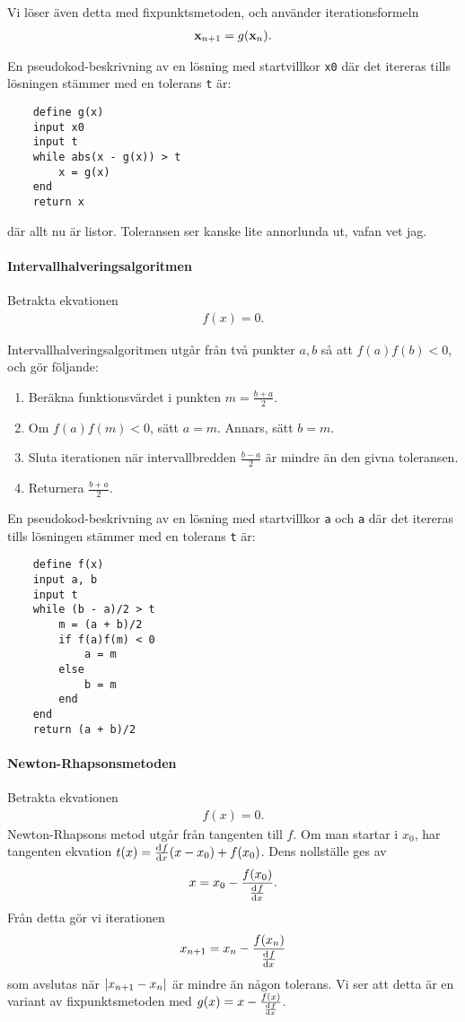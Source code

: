 Vi löser även detta med fixpunktsmetoden, och använder iterationsformeln
\begin{align*}
	\vb{x}_{n + 1} = g(\vb{x}_{n}).
\end{align*}

En pseudokod-beskrivning av en lösning med startvillkor \verb|x0| där det itereras tills lösningen stämmer med en tolerans \verb|t| är:
\begin{lstlisting}
	define g(x)
	input x0
	input t
	while abs(x - g(x)) > t
		x = g(x)
	end
	return x
\end{lstlisting}
där allt nu är listor. Toleransen ser kanske lite annorlunda ut, vafan vet jag.

\paragraph{Intervallhalveringsalgoritmen}
Betrakta ekvationen
\begin{align*}
	f(x) = 0.
\end{align*}

Intervallhalveringsalgoritmen utgår från två punkter $a, b$ så att $f(a)f(b) < 0$, och gör följande:
\begin{enumerate}
	\item Beräkna funktionsvärdet i punkten $m = \frac{b + a}{2}$.
	\item Om $f(a)f(m) < 0$, sätt $a = m$. Annars, sätt $b = m$.
	\item Sluta iterationen när intervallbredden $\frac{b - a}{2}$ är mindre än den givna toleransen.
	\item Returnera $\frac{b + a}{2}$.
\end{enumerate}

En pseudokod-beskrivning av en lösning med startvillkor \verb|a| och \verb|a| där det itereras tills lösningen stämmer med en tolerans \verb|t| är:
\begin{lstlisting}
	define f(x)
	input a, b
	input t
	while (b - a)/2 > t
		m = (a + b)/2
		if f(a)f(m) < 0
			a = m
		else
			b = m
		end
	end
	return (a + b)/2
\end{lstlisting}

\paragraph{Newton-Rhapsonsmetoden}
Betrakta ekvationen
\begin{align*}
	f(x) = 0.
\end{align*}
Newton-Rhapsons metod utgår från tangenten till $f$. Om man startar i $x_{0}$, har tangenten ekvation $t(x) = \dv[]{f}{x} (x_{0})(x - x_{0}) + f(x_{0})$. Dens nollställe ges av
\begin{align*}
	x = x_{0} - \frac{f(x_{0})}{\dv[]{f}{x} (x_{0})}.
\end{align*}
Från detta gör vi iterationen
\begin{align*}
	x_{n + 1} = x_{n} - \frac{f(x_{n})}{\dv[]{f}{x} (x_{n})}
\end{align*}
som avslutas när $\abs{x_{n + 1} - x_{n}}$ är mindre än någon tolerans. Vi ser att detta är en variant av fixpunktsmetoden med $g(x) = x - \frac{f(x)}{\dv[]{f}{x} (x)}$.

